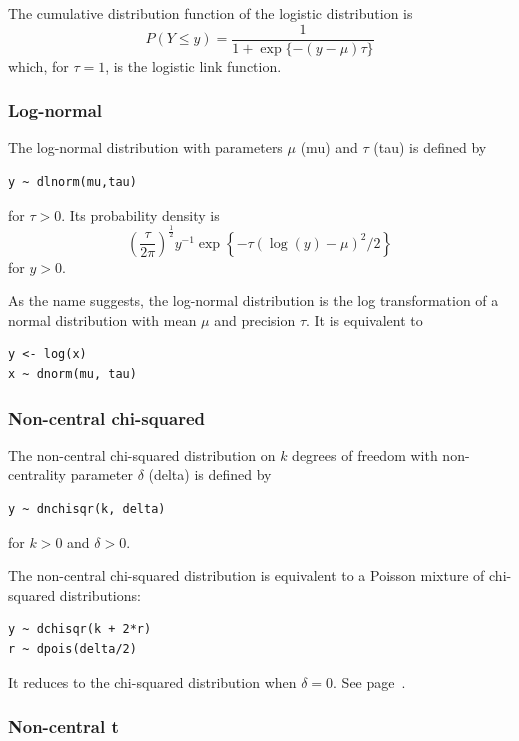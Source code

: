 \documentclass[11pt, a4paper, titlepage]{report}
\begin{document}
The cumulative distribution function of the logistic distribution is
\[
P(Y \leq y) = \frac{1}{\textstyle  1 + \exp\{ - (y - \mu) \tau\}}
\]
which, for $\tau = 1$, is the logistic link function.

\subsubsection{Log-normal}
\label{bugs:dlnorm}

The log-normal distribution with parameters $\mu$ (mu) and $\tau$ (tau) is
defined by
\begin{verbatim}
y ~ dlnorm(mu,tau)
\end{verbatim}
for $\tau > 0$. Its probability density is
\[
\left(
\frac{\tau}{2\pi}
\right)^{\frac{1}{2}} y^{-1} \exp \left\{-\tau (\log(y) - \mu)^2 / 2 \right\}
\]
for $y > 0$.

As the name suggests, the log-normal distribution is the log transformation
of a normal distribution with mean $\mu$ and precision $\tau$. It is
equivalent to
\begin{verbatim}
y <- log(x)
x ~ dnorm(mu, tau)
\end{verbatim}

\subsubsection{Non-central chi-squared}
\label{bugs:dnchisqr}

The non-central chi-squared distribution on $k$ degrees of freedom with
non-centrality parameter $\delta$ (delta) is defined by
\begin{verbatim}
y ~ dnchisqr(k, delta)
\end{verbatim}
for $k > 0$ and $\delta > 0$.

The non-central chi-squared distribution is equivalent to a Poisson
mixture of chi-squared distributions:
\begin{verbatim}
y ~ dchisqr(k + 2*r)
r ~ dpois(delta/2)
\end{verbatim}
It reduces to the chi-squared distribution when $\delta = 0$. See
page~\pageref{bugs:dchisqr}.

\subsubsection{Non-central t}
\label{bugs:dnt}
\end{document}
